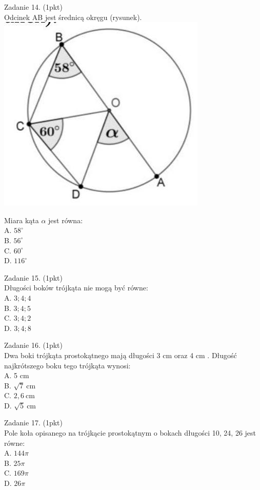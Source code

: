 \documentclass[10pt]{article}
\begin{document}
Zadanie 14. (1pkt)\\
Odcinek AB jest średnicą okręgu (rysunek).\\
\includegraphics[max width=\textwidth, center]{2024_11_21_87037534e5fdc524263ag-04}

Miara kąta \(\alpha\) jest równa:\\
A. \(58^{\circ}\)\\
B. \(56^{\circ}\)\\
C. \(60^{\circ}\)\\
D. \(116^{\circ}\)

Zadanie 15. (1pkt)\\
Długości boków trójkąta nie mogą być równe:\\
A. \(3 ; 4 ; 4\)\\
B. \(3 ; 4 ; 5\)\\
C. \(3 ; 4 ; 2\)\\
D. \(3 ; 4 ; 8\)

Zadanie 16. (1pkt)\\
Dwa boki trójkąta prostokątnego mają długości 3 cm oraz 4 cm . Długość najkrótszego boku tego trójkąta wynosi:\\
A. 5 cm\\
B. \(\sqrt{7} \mathrm{~cm}\)\\
C. \(2,6 \mathrm{~cm}\)\\
D. \(\sqrt{5} \mathrm{~cm}\)

Zadanie 17. (1pkt)\\
Pole koła opisanego na trójkącie prostokątnym o bokach długości 10, 24, 26 jest równe:\\
A. \(144 \pi\)\\
B. \(25 \pi\)\\
C. \(169 \pi\)\\
D. \(26 \pi\)
\end{document}
